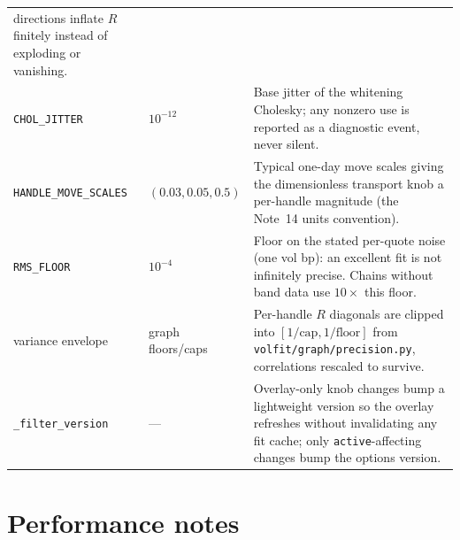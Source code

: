 \documentclass[11pt]{article}
\begin{document}
\begin{longtable}{p{}p{}p{}}
directions inflate $R$ finitely instead of exploding or vanishing.\\
\texttt{CHOL\_JITTER} & $10^{-12}$ & Base jitter of the whitening Cholesky;
any nonzero use is reported as a diagnostic event, never silent.\\
\texttt{HANDLE\_MOVE\_SCALES} & $(0.03,0.05,0.5)$ & Typical one-day move
scales giving the dimensionless transport knob a per-handle magnitude (the
Note~14 units convention).\\
\texttt{RMS\_FLOOR} & $10^{-4}$ & Floor on the stated per-quote noise (one vol
bp): an excellent fit is not infinitely precise. Chains without band data use
$10\times$ this floor.\\
variance envelope & graph floors/caps & Per-handle $R$ diagonals are clipped
into $[1/\text{cap},1/\text{floor}]$ from
\nolinkurl{volfit/graph/precision.py}, correlations rescaled to survive.\\
\texttt{\_filter\_version} & --- & Overlay-only knob changes bump a
lightweight version so the overlay refreshes without invalidating any fit
cache; only \texttt{active}-affecting changes bump the options version.\\
\bottomrule
\end{longtable}
\endgroup

\section{Performance notes}
\label{app:perf}
\end{document}

